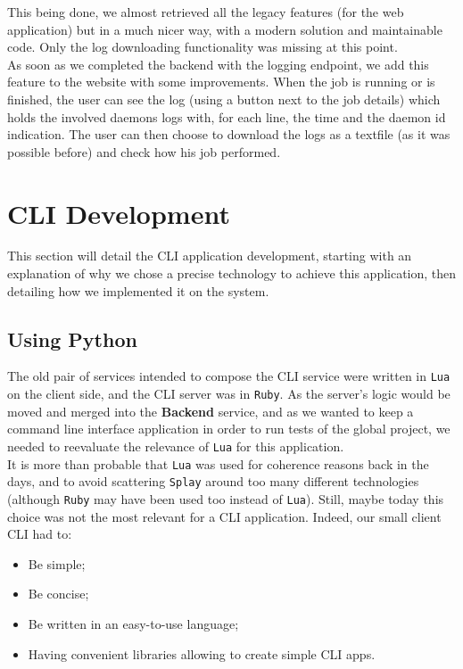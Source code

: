 \documentclass{eplmastersthesis}
\begin{document}
        This being done, we almost retrieved all the legacy features (for the
        web application) but in a much nicer way, with a modern solution
        and maintainable code. Only the log downloading functionality was
        missing at this point. \\
        As soon as we completed the backend with the logging endpoint, we
        add this feature to the website with some improvements. When the
        job is running or is finished, the user can see the log (using a
        button next to the job details) which holds the involved daemons logs
        with, for each line, the time and the daemon id indication. The user
        can then choose to download the logs as a textfile (as it was possible
        before) and check how his job performed.

    \section{CLI Development}

      This section will detail the CLI application development, starting
      with an explanation of why we chose a precise technology to achieve
      this application, then detailing how we implemented it on the system.

      \subsection{Using Python}

        The old pair of services intended to compose the CLI service were
        written in \texttt{Lua} on the client side, and the CLI server was in \texttt{Ruby}. As
        the server's logic would be moved and merged into the \textbf{Backend}
        service, and as we wanted to keep a command line interface application
        in order to run tests of the global project, we needed to reevaluate
        the relevance of \texttt{Lua} for this application.\\

        It is more than probable that \texttt{Lua} was used for coherence reasons back
        in the days, and to avoid scattering \texttt{Splay} around too many different
        technologies (although \texttt{Ruby} may have been used too instead of \texttt{Lua}).
        Still, maybe today this choice was not the most relevant for a CLI
        application. Indeed, our small client CLI had to:

        \begin{itemize}
          \item Be simple;
          \item Be concise;
          \item Be written in an easy-to-use language;
          \item Having convenient libraries allowing to create simple CLI apps.
        \end{itemize}
\end{document}
